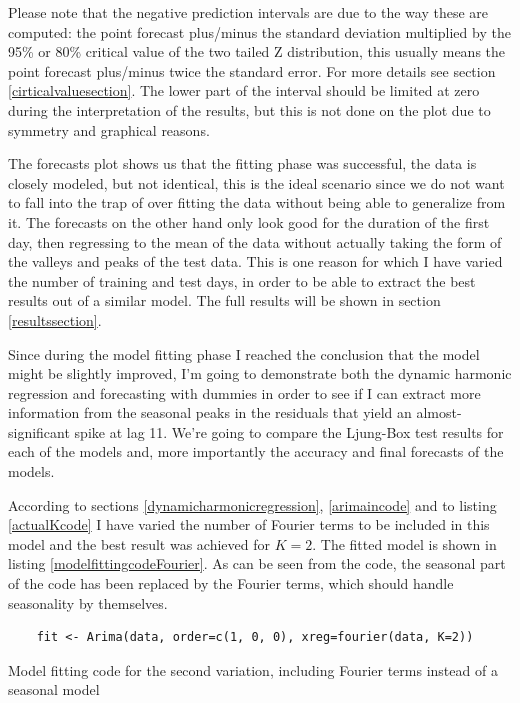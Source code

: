 \documentclass[12pt,a4paper,titlepage]{report}
\begin{document}
Please note that the negative prediction intervals are due to the way these are computed: the point forecast plus/minus the standard deviation multiplied by the 95\% or 80\% critical value of the two tailed Z distribution, this usually means the point forecast plus/minus twice the standard error. For more details see section \ref{cirticalvaluesection}. The lower part of the interval should be limited at zero during the
interpretation of the results, but this is not done on the plot due to symmetry and graphical reasons.

The forecasts plot shows us that the fitting phase was successful, the data is closely modeled, but not identical, this is the ideal scenario since we do not want to fall into the trap of over fitting the data without being able to generalize from it. The forecasts on the other hand only look good for the duration of the first day, then regressing to the mean of the data without actually taking the form of the valleys and peaks of the test data. This is one reason for which I have varied the number of training and test days, in order to be able to extract the best results out of a similar model. The full results will be shown in section \ref{resultssection}.

Since during the model fitting phase I reached the conclusion that the model might be slightly improved, I'm going to demonstrate both the dynamic harmonic regression and forecasting with dummies in order to see if I can extract more information from the seasonal peaks in the residuals that yield an almost-significant spike at lag 11. We're going to compare the Ljung-Box test results for each of the models and, more importantly the accuracy and final forecasts of the models.

According to sections \ref{dynamicharmonicregression}, \ref{arimaincode} and to listing \ref{actualKcode} I have varied the number of Fourier terms to be included in this model and the best result was achieved for $ K = 2 $. The fitted model is shown in listing \ref{modelfittingcodeFourier}. As can be seen from the code, the seasonal part of the code has been replaced by the Fourier terms, which should handle seasonality by themselves.

\begin{listing}[h]
    \begin{verbatim}
    fit <- Arima(data, order=c(1, 0, 0), xreg=fourier(data, K=2))
    \end{verbatim}
    
    \caption{Model fitting code for the second variation, including Fourier terms instead of a seasonal model}
    \label{modelfittingcodeFourier}
\end{listing}
\end{document}
